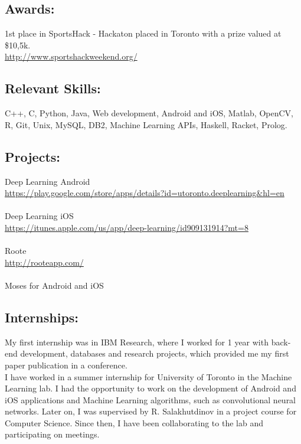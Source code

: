 \documentclass{article}
\begin{document}
\subsection{Awards:}
1st place in SportsHack - Hackaton placed in Toronto with a prize valued at \$10,5k.\\\url{http://www.sportshackweekend.org/}

\subsection{Relevant Skills:}
 C++, C, Python, Java, Web development, Android and iOS, Matlab, OpenCV, R, Git, Unix, MySQL, DB2, Machine Learning APIs, Haskell, Racket, Prolog.

\subsection{Projects:}
Deep Learning Android\\\url{https://play.google.com/store/apps/details?id=utoronto.deeplearning&hl=en}\\\\
Deep Learning iOS\\\url{https://itunes.apple.com/us/app/deep-learning/id909131914?mt=8}\\\\
Roote\\\url{http://rooteapp.com/}\\\\
Moses for Android and iOS\\

\subsection{Internships:}
My first internship was in IBM Research, where I worked for 1 year with back-end development, databases and research projects, which provided me my first paper publication in a conference.\\
I have worked in a summer internship for University of Toronto in the Machine Learning lab. I had the opportunity to work on the development of Android and iOS applications and Machine Learning algorithms, such as convolutional neural networks. Later on, I was supervised by R. Salakhutdinov in a project course for Computer Science. Since then, I have been collaborating to the lab and participating on meetings.

\end{document}
